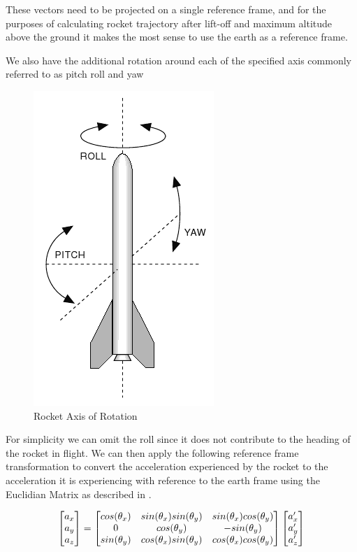 \documentclass[conference, letterpaper]{IEEEtran}
\begin{document}
These vectors need to be projected on a single reference frame, and for the purposes of calculating
rocket trajectory after lift-off and maximum altitude above the ground it makes the most sense to
use the earth as a reference frame.

We also have the additional rotation around each of the specified axis commonly referred to as
pitch roll and yaw

\begin{figure}[H]
\centering
\includegraphics[scale=0.50]{./pitch_roll_yaw}
\caption{Rocket Axis of Rotation}
\label{fig:pitch_roll_yaw}
\end{figure}

For simplicity we can omit the roll since it does not contribute to the heading of the rocket in flight.
We can then apply the following reference frame transformation to convert the acceleration experienced
by the rocket to the acceleration it is experiencing with reference to the earth frame using the Euclidian Matrix
as described in \citep{mallick_2016}.
\vspace{5mm}

\begin{equation}\label{eq:2}
  \begin{bmatrix}a_x \\ a_y \\ a_z
  \end{bmatrix} =

  \vspace{5mm}
  \begin{bmatrix}
    cos(\theta_x) & sin(\theta_x)sin(\theta_y) & sin(\theta_x)cos(\theta_y) \\
    0 & cos(\theta_y) & -sin(\theta_y) \\
    sin(\theta_y) & cos(\theta_x)sin(\theta_y) & cos(\theta_x)cos(\theta_y) \\
  \end{bmatrix}
  \begin{bmatrix} a'_x \\ a'_y \\ a'_z \end{bmatrix}
\end{equation}
\end{document}
